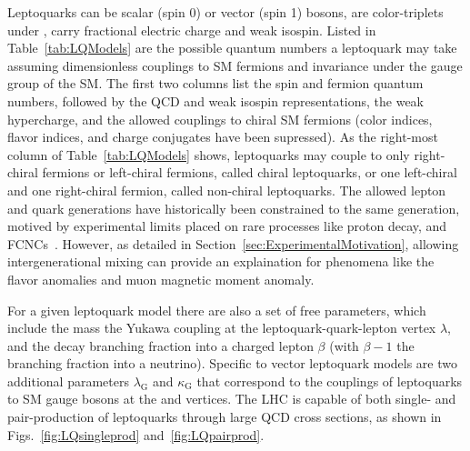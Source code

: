 

Leptoquarks can be scalar (spin 0) or vector (spin 1) bosons, are color-triplets under \SUthreeC, carry fractional electric charge and weak isospin. Listed in Table~\ref{tab:LQModels} are the possible quantum numbers a leptoquark may take assuming dimensionless couplings to SM fermions and invariance under the gauge group of the SM. The first two columns list the spin and fermion quantum numbers, followed by the QCD and weak isospin representations, the weak hypercharge, and the allowed couplings to chiral SM fermions (color indices, flavor indices, and charge conjugates have been supressed). As the right-most column of Table~\ref{tab:LQModels} shows, leptoquarks may couple to only right-chiral fermions or left-chiral fermions, called chiral leptoquarks, or one left-chiral and one right-chiral fermion, called non-chiral leptoquarks. The allowed lepton and quark generations have historically been constrained to the same generation, motived by experimental limits placed on rare processes like proton decay, and FCNCs~\cite{FCNC}. However, as detailed in Section~\ref{sec:ExperimentalMotivation}, allowing intergenerational mixing can provide an explaination for phenomena like the flavor anomalies and muon magnetic moment anomaly. 

For a given leptoquark model there are also a set of free parameters, which include the mass \MLQ the Yukawa coupling at the leptoquark-quark-lepton vertex $\lambda$, and the decay branching fraction into a charged lepton $\beta$ (with $\beta-1$ the branching fraction into a neutrino). Specific to vector leptoquark models are two additional parameters $\lambda_{\text{G}}$ and $\kappa_{\text{G}}$ that correspond to the couplings of leptoquarks to SM gauge bosons at the \HepProcess{\Pgluon\LQ} and \HepProcess{\Pgluon\Pgluon\LQ} vertices. The LHC is capable of both single- and pair-production of leptoquarks through large QCD cross sections, as shown in Figs.~\ref{fig:LQsingleprod} and~\ref{fig:LQpairprod}. 

